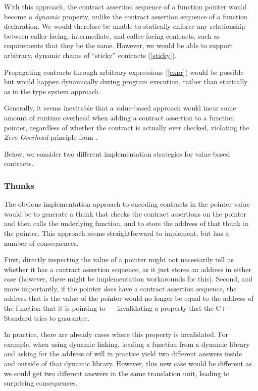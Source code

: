 With this approach, the contract assertion sequence of a function pointer would become a \emph{dynamic} property, unlike the contract assertion sequence of a function declaration. We would therefore be unable to statically enforce any relationship between caller-facing, intermediate, and callee-facing contracts, such as requirements that they be the same. However, we would be able to support arbitrary, dynamic chains of ``sticky'' contracts (\ref{sticky}). 

Propagating contracts through arbitrary expressions (\ref{expr}) would be possible but would happen dynamically during program execution, rather than statically as in the type system approach.

Generally, it seems inevitable that a value-based approach would incur some amount of runtime overhead when adding a contract assertion to a function pointer, regardless of whether the contract is actually ever checked, violating the \emph{Zero Overhead} principle from \cite{P2900R8}.

Below, we consider two different implementation strategies for value-based contracts.

\subsubsection{Thunks}
\label{thunks}

The obvious implementation approach to encoding contracts in the pointer value would be to generate a thunk that checks the contract assertions on the pointer and then calls the underlying function, and to store the address of that thunk in the pointer. This approach seems straightforward to implement, but has a number of consequences.

First, directly inspecting the value of a pointer might not necessarily tell us whether it has a contract assertion sequence, as it just stores an address in either case (however, there might be implementation workarounds for this). Second, and more importantly, if the pointer \emph{does} have a contract assertion sequence, the address that is the value of the pointer would no longer be equal to the address of the function that it is pointing to --- invalidating a property that the C++ Standard tries to guarantee.

In practice, there are already cases where this property is invalidated. For example, when using dynamic linking, loading a function  from a dynamic library and asking for the address of  will in practice yield two different answers inside and outside of that dynamic library. However, this new case would be different as we could get two different answers in the same translation unit, leading to surprising consequences.

